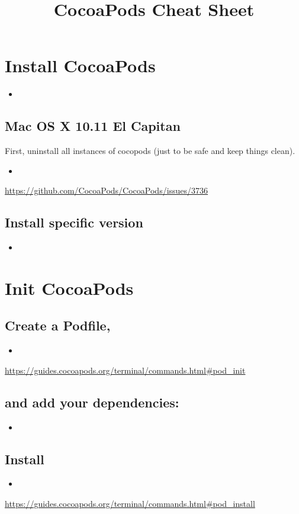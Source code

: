 \documentclass[a4paper, twocolumn]{article}
\title{CocoaPods Cheat Sheet}
\newcommand{\insertcode}[2]{\begin{itemize}\item[]\end{itemize}} %
\newcommand{\insertshellcode}[2]{\begin{itemize}\item[]\end{itemize}} %
\begin{document}
\maketitle
\section{Install CocoaPods}
\insertshellcode{"Scripts/installCocoaPods.txt"}{} %
\subsection{Mac OS X 10.11 El Capitan}
First, uninstall all instances of cocopods (just to be safe and keep things clean).
\insertshellcode{"Scripts/installCocoaPodsElCapitan.txt"}{} %
\url{https://github.com/CocoaPods/CocoaPods/issues/3736}

\subsection{Install specific version}
\insertshellcode{"Scripts/installCocoaPodsVersion.txt"}{} %

\section{Init CocoaPods}
\subsection{Create a Podfile,}
\insertshellcode{"Scripts/createPodfile.txt"}{} %
\url{https://guides.cocoapods.org/terminal/commands.html#pod_init}
\subsection{and add your dependencies:}
\insertcode{"Scripts/Podfile"}{} %
\subsection{Install}
\insertshellcode{"Scripts/installPods.txt"}{} %
\url{https://guides.cocoapods.org/terminal/commands.html#pod_install}
\end{document}
